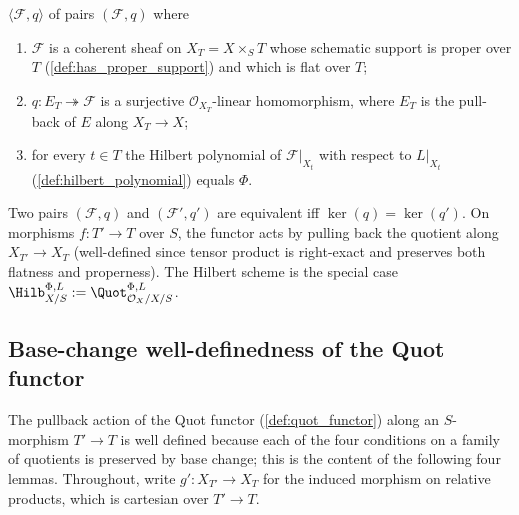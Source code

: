 \begin{definition}
  \(\langle \mathcal{F}, q\rangle\) of pairs \((\mathcal{F}, q)\) where
  \begin{enumerate}
    \item \(\mathcal{F}\) is a coherent sheaf on \(X_T = X \times_S T\) whose
      schematic support is proper over \(T\) (\cref{def:has_proper_support}) and
      which is flat over \(T\);
    \item \(q : E_T \twoheadrightarrow \mathcal{F}\) is a surjective
      \(\mathcal{O}_{X_T}\)-linear homomorphism, where \(E_T\) is the pull-back
      of \(E\) along \(X_T \to X\);
    \item for every \(t \in T\) the Hilbert polynomial of \(\mathcal{F}|_{X_t}\)
      with respect to \(L|_{X_t}\) (\cref{def:hilbert_polynomial}) equals
      \(\Phi\).
  \end{enumerate}
  Two pairs \((\mathcal{F}, q)\) and \((\mathcal{F}', q')\) are equivalent iff
  \(\ker(q) = \ker(q')\). On morphisms \(f : T' \to T\) over \(S\), the functor
  acts by pulling back the quotient along \(X_{T'} \to X_T\) (well-defined
  since tensor product is right-exact and preserves both flatness and
  properness). The Hilbert scheme is the special case
  \(\Hilb^{\Phi,L}_{X/S} := \Quot^{\Phi,L}_{\mathcal{O}_X/X/S}\).
\end{definition}

\subsection{Base-change well-definedness of the Quot functor}
\label{sec:quot_base_change}

The pullback action of the Quot functor (\cref{def:quot_functor}) along an
\(S\)-morphism \(T' \to T\) is well defined because each of the four
conditions on a family of quotients is preserved by base change; this is the
content of the following four lemmas.  Throughout, write
\(g' : X_{T'} \to X_T\) for the induced morphism on relative products, which
is cartesian over \(T' \to T\).

